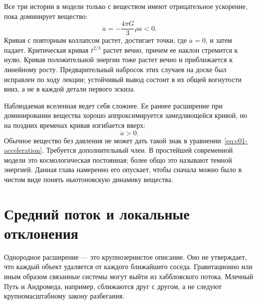 Все три истории в модели только с веществом имеют отрицательное ускорение, пока доминирует вещество:
\begin{equation}
\ddot a=-\frac{4\pi G}{3}\rho a<0.
\end{equation}
Кривая с повторным коллапсом растет, достигает точки, где \(\dot a=0\), и затем падает. Критическая кривая \(t^{2/3}\) растет вечно, причем ее наклон стремится к нулю. Кривая положительной энергии тоже растет вечно и приближается к линейному росту. Предварительный набросок этих случаев на доске был исправлен по ходу лекции; устойчивый вывод состоит в их общей вогнутости вниз, а не в каждой детали первого эскиза.

Наблюдаемая вселенная ведет себя сложнее. Ее раннее расширение при доминировании вещества хорошо аппроксимируется замедляющейся кривой, но на поздних временах кривая изгибается вверх:
\begin{equation}
\ddot a>0.
\end{equation}
Обычное вещество без давления не может дать такой знак в уравнении~\eqref{eq:c01-acceleration}. Требуется дополнительный член. В простейшей современной модели это космологическая постоянная; более общо это называют темной энергией. Данная глава намеренно его опускает, чтобы сначала можно было в чистом виде понять ньютоновскую динамику вещества.

\begin{classroomqa}
\end{classroomqa}

\section{Средний поток и локальные отклонения}

Однородное расширение — это крупнозернистое описание. Оно не утверждает, что каждый объект удаляется от каждого ближайшего соседа. Гравитационно или иным образом связанные системы могут выйти из хаббловского потока. Млечный Путь и Андромеда, например, сближаются друг с другом, а не следуют крупномасштабному закону разбегания.

